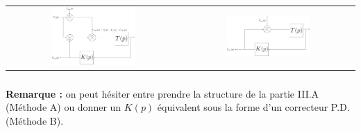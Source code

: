 \documentclass[10pt,fleqn]{article} %
\begin{document}
\begin{center}
\begin{tabular}{cc}
\includegraphics[width=0.5\textwidth]{images/DR_B_corrige2.pdf}
&
\includegraphics[width=0.5\textwidth]{images/DR_B_corrige3.pdf}
\end{tabular}
\end{center}

\subparagraph{}%

\textbf{Remarque : } on peut hésiter entre prendre la structure de la partie III.A (Méthode A) ou donner un $K(p)$ équivalent sous la forme d'un correcteur P.D. (Méthode B).
\end{document}
